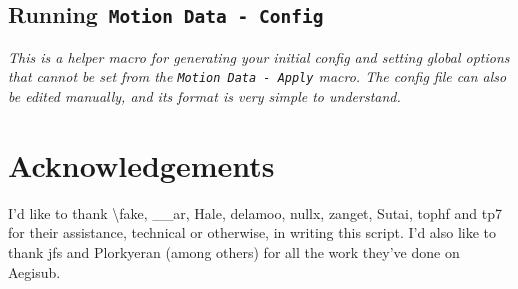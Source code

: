 ﻿\documentclass[a4paper,12pt]{article}
\begin{document}
  \subsection{Running{\tt{} Motion Data - Config}}
  \emph{This is a helper macro for generating your initial config and setting global options that cannot be set from the {\tt Motion Data - Apply} macro. The config file can also be edited manually, and its format is very simple to understand.}
  

    
  \section*{Acknowledgements}
  I'd like to thank \textbackslash{}fake, \_\_ar, Hale, delamoo, nullx, zanget, Sutai, tophf and tp7 for their assistance, technical or otherwise, in writing this script. I'd also like to thank jfs and Plorkyeran (among others) for all the work they've done on Aegisub.  
\end{document}
